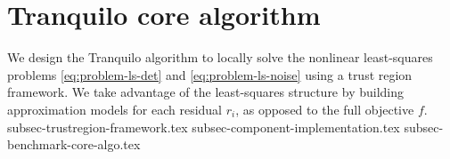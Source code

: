 \section{Tranquilo core algorithm}
\label{sec:tranquilo-core}

We design the Tranquilo algorithm to locally solve the nonlinear least-squares problems \ref{eq:problem-ls-det} and \ref{eq:problem-ls-noise} using a trust region framework. We take advantage of the least-squares structure by building approximation models for each residual $r_i$, as opposed to the full objective $f$.
{subsec-trustregion-framework.tex}
{subsec-component-implementation.tex}
{subsec-benchmark-core-algo.tex}
